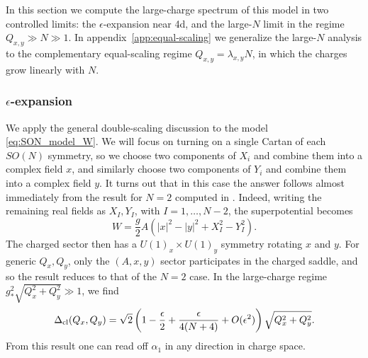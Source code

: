 \documentclass[a4paper,11pt]{article}
\begin{document}
In this section we compute the large-charge spectrum of this model in two controlled limits: the $\epsilon$-expansion near 4d, and the large-$N$ limit in the regime $Q_{x,y}\gg N\gg 1$. In appendix~\ref{app:equal-scaling} we generalize the large-$N$ analysis to the complementary equal-scaling regime $Q_{x,y}=\lambda_{x,y}N$, in which the charges grow linearly with $N$.

\subsubsection{$\epsilon$-expansion}

We apply the general double-scaling discussion to the model \eqref{eq:SON_model_W}. We will focus on turning on a single Cartan of each $SO(N)$ symmetry, so we choose two components of $X_i$ and combine them into a complex field $x$, and similarly choose two components of $Y_i$ and combine them into a complex field $y$. It turns out that in this case the answer follows almost immediately from the result for $N=2$ computed in \cite{Cuomo:2024fuy}. Indeed, writing the remaining real fields as $X_I,Y_I$, with $I=1,\ldots,N-2$, the superpotential becomes
\begin{equation}
  W=\frac{g}{2}A\left(|x|^2-|y|^2+X_I^2-Y_I^2\right).
\end{equation}
The charged sector then has a $U(1)_x\times U(1)_y$ symmetry rotating $x$ and $y$. For generic $Q_x,Q_y$, only the $(A,x,y)$ sector participates in the charged saddle, and so the result reduces to that of the $N=2$ case. In the large-charge regime $g_*^2\sqrt{Q_x^2+Q_y^2}\gg1$, we find
\begin{equation}
    \Delta_{\rm cl}(Q_x,Q_y) = \sqrt{2}\left(1-\frac{\epsilon}{2} +\frac{\epsilon}{4(N+4)}
    +O(\epsilon^2)\right) \sqrt{Q_x^2+Q_y^2}.
    \label{eq:son-epsilon-alpha1-general}
\end{equation}
From this result one can read off $\alpha_1$ in any direction in charge space.
\end{document}
